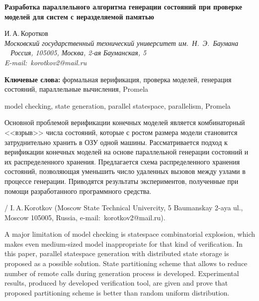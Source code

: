 \documentclass[12pt,a4paper,fleqn]{article}
\begin{document}
\begin{center}{ \fontsize{18pt}{23pt}\selectfont\bf Разработка параллельного алгоритма генерации состояний при проверке
    моделей для систем с неразделяемой памятью}
\end{center}

\vspace{5mm}

\begin{center}
И.\,А.\,Коротков\\
\footnotesize\it Московский государственный технический университет им.~Н.~Э.~Баумана\\\
\rm
Россия, 105005, Москва, 2-ая Бауманская, 5\\
E-mail:~korotkov2@mail.ru

\hspace{1.25cm}

\vspace{8mm}

\begin{minipage}{12.16cm}\noindent

\footnotesize{\bf Ключевые слова:} формальная верификация, проверка моделей, генерация состояний, параллельные
вычисления, Promela

 model checking, state generation, parallel statespace, parallelism, Promela

\vspace{6mm}

\noindent Основной проблемой верификации конечных моделей является комбинаторный <<взрыв>> числа состояний, которые с
ростом размера модели становится затруднительно хранить в ОЗУ одной машины. Рассматривается подход к верификации
конечных моделей на основе параллельной генерации состояний и их распределенного хранения. Предлагается схема
распределенного хранения состояний, позволяющая уменьшить число удаленных вызовов между узлами в процессе
генерации. Приводятся результаты экспериментов, полученные при помощи разработанного программного средства.

\vspace{4mm}

 /
I.\,A.\,Korotkov (Moscow State Technical Univercity, 5 Baumanskay 2-aya ul., Moscow 105005, Russia,
e-mail:~korotkov2@mail.ru).

A major limitation of model checking is statespace combinatorial explosion, which makes even medium-sized model
inappropriate for that kind of verification. In this paper, parallel statespace generation with distributed state
storage is proposed as a possible solution. State partitioning scheme that allows to reduce number of remote calls
during generation process is developed.  Experimental results, produced by developed verification tool, are given and
prove that proposed partitioning scheme is better than random uniform distribution.
\end{minipage}

\end{center}
\end{document}
